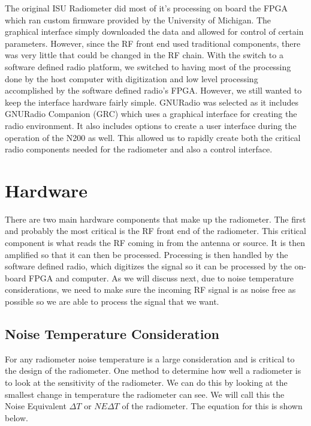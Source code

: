 The original ISU Radiometer did most of it's processing on board the FPGA which ran custom firmware provided by the University of Michigan.  The graphical interface simply downloaded the data and allowed for control of certain parameters.  However, since the RF front end used traditional components, there was very little that could be changed in the RF chain.  With the switch to a software defined radio platform, we switched to having most of the processing done by the host computer with digitization and low level processing accomplished by the software defined radio's FPGA.  However, we still wanted to keep the interface hardware fairly simple.  GNURadio was selected as it includes GNURadio Companion (GRC) which uses a graphical interface for creating the radio environment.  It also includes options to create a user interface during the operation of the N200 as well.  This allowed us to rapidly create both the critical radio components needed for the radiometer and also a control interface.


\section{Hardware}
There are two main hardware components that make up the radiometer.  The first and probably the most critical is the RF front end of the radiometer.  This critical component is what reads the RF coming in from the antenna or source.  It is then amplified so that it can then be processed.  Processing is then handled by the software defined radio, which digitizes the signal so it can be processed by the on-board FPGA and computer.  As we will discuss next, due to noise temperature considerations, we need to make sure the incoming RF signal is as noise free as possible so we are able to process the signal that we want.  



\subsection{Noise Temperature Consideration}

For any radiometer noise temperature is a large consideration and is critical to the design of the radiometer.  One method to determine how well a radiometer is to look at the sensitivity of the radiometer.  We can do this by looking at the smallest change in temperature the radiometer can see.  We will call this the Noise Equivalent $\Delta T$ or $NE\Delta T$ of the radiometer.  The equation for this is shown below.


